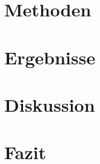 \documentclass[12pt,a4paper,twoside]{scrartcl}
\begin{document}
\section{Methoden}
\label{sec:methoden}

%

\section{Ergebnisse}
\label{sec:ergebnisse}

%

\section{Diskussion}
\label{sec:diskussion}

%

\section{Fazit}
\label{sec:fazit}

%
\newpage


%



\newpage
\appendix

%


\end{document}
